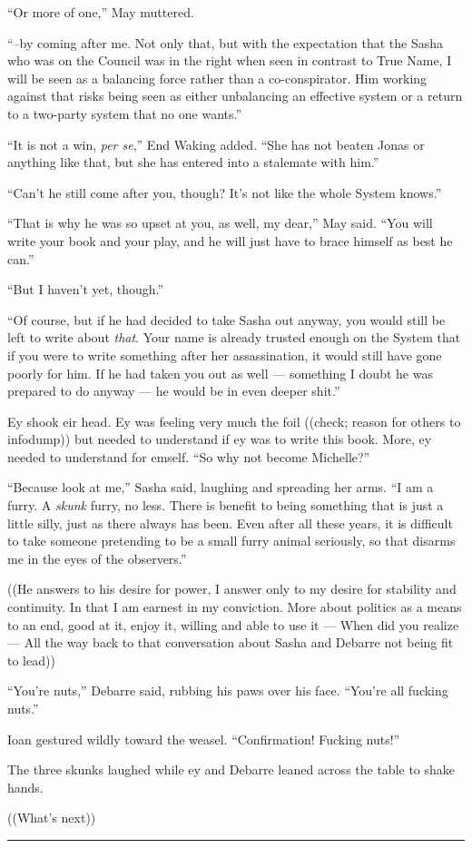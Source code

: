 ``Or more of one,'' May muttered.

``--by coming after me. Not only that, but with the expectation that the Sasha who was on the Council was in the right when seen in contrast to True Name, I will be seen as a balancing force rather than a co-conspirator. Him working against that risks being seen as either unbalancing an effective system or a return to a two-party system that no one wants.''

``It is not a win, \emph{per se},'' End Waking added. ``She has not beaten Jonas or anything like that, but she has entered into a stalemate with him.''

``Can't he still come after you, though? It's not like the whole System knows.''

``That is why he was so upset at you, as well, my dear,'' May said. ``You will write your book and your play, and he will just have to brace himself as best he can.''

``But I haven't yet, though.''

``Of course, but if he had decided to take Sasha out anyway, you would still be left to write about \emph{that}. Your name is already trusted enough on the System that if you were to write something after her assassination, it would still have gone poorly for him. If he had taken you out as well — something I doubt he was prepared to do anyway — he would be in even deeper shit.''

Ey shook eir head. Ey was feeling very much the foil ((check; reason for others to infodump)) but needed to understand if ey was to write this book. More, ey needed to understand for emself. ``So why not become Michelle?''

``Because look at me,'' Sasha said, laughing and spreading her arms. ``I am a furry. A \emph{skunk} furry, no less. There is benefit to being something that is just a little silly, just as there always has been. Even after all these years, it is difficult to take someone pretending to be a small furry animal seriously, so that disarms me in the eyes of the observers.''

((He answers to his desire for power, I answer only to my desire for stability and continuity. In that I am earnest in my conviction. More about politics as a means to an end, good at it, enjoy it, willing and able to use it — When did you realize — All the way back to that conversation about Sasha and Debarre not being fit to lead))

``You're nuts,'' Debarre said, rubbing his paws over his face. ``You're all fucking nuts.''

Ioan gestured wildly toward the weasel. ``Confirmation! Fucking nuts!''

The three skunks laughed while ey and Debarre leaned across the table to shake hands.

((What's next))

\begin{center}\rule{0.5\linewidth}{0.5pt}\end{center}
